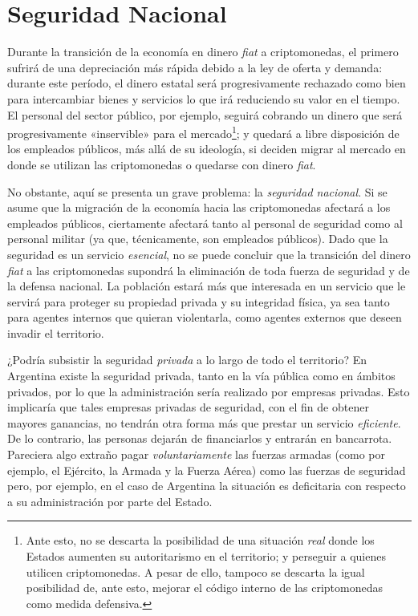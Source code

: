 \documentclass[12pt,a4paper,twoside]{book}
\begin{document}
\section{Seguridad Nacional}
Durante la transición de la economía en dinero \textit{fiat} a criptomonedas, el primero sufrirá de una depreciación más rápida debido a la ley de oferta y demanda: durante este período, el dinero estatal será progresivamente rechazado como bien para intercambiar bienes y servicios lo que irá reduciendo su valor en el tiempo. El personal del sector público, por ejemplo, seguirá cobrando un dinero que será progresivamente «inservible» para el mercado\footnote{Ante esto, no se descarta la posibilidad de una situación \textit{real} donde los Estados aumenten su autoritarismo en el territorio; y perseguir a quienes utilicen criptomonedas. A pesar de ello, tampoco se descarta la igual posibilidad de, ante esto, mejorar el código interno de las criptomonedas como medida defensiva.}; y quedará a libre disposición de los empleados públicos, más allá de su ideología, si deciden migrar al mercado en donde se utilizan las criptomonedas o quedarse con dinero \textit{fiat}.

No obstante, aquí se  presenta un grave problema: la \textit{seguridad nacional}. Si se asume que la migración de la economía hacia las criptomonedas afectará a los empleados públicos, ciertamente afectará tanto al personal de seguridad como al personal militar (ya que, técnicamente, son empleados públicos). Dado que la seguridad es un servicio \textit{esencial}, no se puede concluir que la transición del dinero \textit{fiat} a las criptomonedas supondrá la eliminación de toda fuerza de seguridad y de la defensa nacional. La población estará más que interesada en un servicio que le servirá para proteger su propiedad privada y su integridad física, ya sea tanto para agentes internos que quieran violentarla, como agentes externos que deseen invadir el territorio.

¿Podría subsistir la seguridad \textit{privada} a lo largo de todo el territorio? En Argentina existe la seguridad privada, tanto en la vía pública como en ámbitos privados, por lo que la administración sería realizado por empresas privadas. Esto implicaría que tales empresas privadas de seguridad, con el fin de obtener mayores ganancias, no tendrán otra forma más que prestar un servicio \textit{eficiente}. De lo contrario, las personas dejarán de financiarlos y entrarán en bancarrota. Pareciera algo extraño pagar \textit{voluntariamente} las fuerzas armadas (como por ejemplo, el Ejército, la Armada y la Fuerza Aérea) como las fuerzas de seguridad pero, por ejemplo, en el caso de Argentina la situación es deficitaria con respecto a su administración por parte del Estado.
\end{document}
